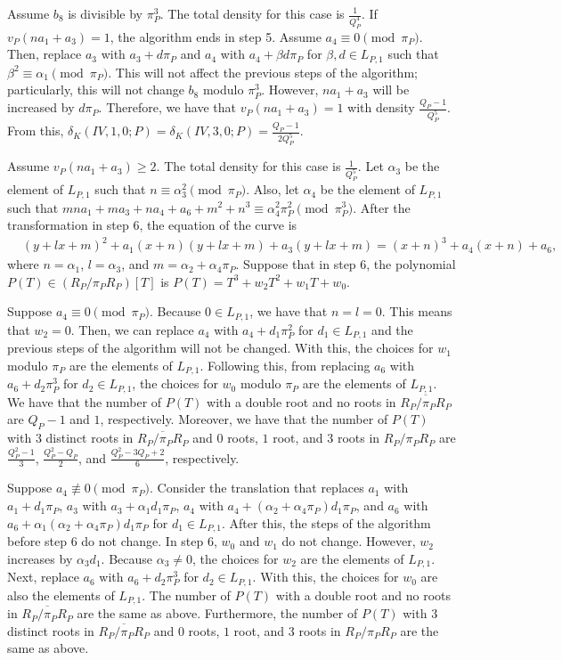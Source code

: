 \documentclass[12pt,letterpaper]{amsart}
\theoremstyle{definition}
\begin{document}
Assume $b_8$ is divisible by $\pi_P^3$. The total density for this case is $\frac{1}{Q_P^4}$. If $v_P(n a_1+a_3)=1$, the algorithm ends in step 5. Assume $a_4\equiv 0\pmod{\pi_P}$. Then, replace $a_3$ with $a_3+d\pi_P$ and $a_4$ with $a_4+\beta d\pi_P$ for $\beta, d\in L_{P,1}$ such that $\beta^2\equiv\alpha_1\pmod{\pi_P}$. This will not affect the previous steps of the algorithm; particularly, this will not change $b_8$ modulo $\pi_P^3$. However, $na_1+a_3$ will be increased by $d\pi_P$. Therefore, we have that $v_P(n a_1+a_3)=1$ with density $\frac{Q_P-1}{Q_P^5}$. From this, $\delta_K(IV,1,0;P)=\delta_K(IV,3,0;P)=\frac{Q_P-1}{2Q_P^5}$.

Assume $v_P(n a_1+a_3)\geq 2$. The total density for this case is $\frac{1}{Q_P^5}$. Let $\alpha_3$ be the element of $L_{P, 1}$ such that $n\equiv\alpha_3^2\pmod{\pi_P}$. Also, let $\alpha_4$ be the element of $L_{P, 1}$ such that
$mna_1+ma_3+na_4+a_6+m^2+n^3\equiv \alpha_4^2\pi_P^2\pmod{\pi_P^3}$. After the transformation in step 6, the equation of the curve is
\begin{align*}
& (y+l x+m)^2+a_1(x+n)(y+l x+m)+a_3(y+l x+m)  =(x+n)^3+a_4(x+n)+a_6,
\end{align*}
where $n=\alpha_1$, $l=\alpha_3$, and $m=\alpha_2+\alpha_4\pi_P$. Suppose that in step 6, the polynomial $P(T)\in (R_P/\pi_PR_P)[T]$ is $P(T)=T^3+w_2T^2+w_1T+w_0$.

Suppose $a_4\equiv 0\pmod{\pi_P}$. Because $0\in L_{P, 1}$, we have that $n=l=0$. This means that $w_2=0$. Then, we can replace $a_4$ with $a_4+d_1\pi_P^2$ for $d_1\in L_{P,1}$ and the previous steps of the algorithm will not be changed. With this, the choices for $w_1$ modulo $\pi_P$ are the elements of $L_{P,1}$. Following this, from replacing $a_6$ with $a_6+d_2\pi_P^3$ for $d_2\in L_{P,1}$, the choices for $w_0$ modulo $\pi_P$ are the elements of $L_{P,1}$. We have that the number of $P(T)$ with a double root and no roots in $\overline{R_P/\pi_PR_P}$ are $Q_P-1$ and $1$, respectively. Moreover, we have that the number of $P(T)$ with $3$ distinct roots in $\overline{R_P/\pi_PR_P}$ and $0$ roots, $1$ root, and $3$ roots in $R_P/\pi_PR_P$ are $\frac{Q_P^2-1}{3}$, $\frac{Q_P^2-Q_P}{2}$, and $\frac{Q_P^2-3Q_P+2}{6}$, respectively.

Suppose $a_4\not\equiv 0\pmod{\pi_P}$. Consider the translation that replaces $a_1$ with $a_1+d_1\pi_P$, $a_3$ with $a_3+\alpha_1d_1\pi_P$, $a_4$ with $a_4+(\alpha_2+\alpha_4\pi_P)d_1\pi_P$, and $a_6$ with $a_6+\alpha_1(\alpha_2+\alpha_4\pi_P) d_1\pi_P$ for $d_1\in L_{P,1}$. After this, the steps of the algorithm before step 6 do not change. In step 6, $w_0$ and $w_1$ do not change. However, $w_2$ increases by $\alpha_3d_1$. Because $\alpha_3\not=0$, the choices for $w_2$ are the elements of $L_{P,1}$. Next, replace $a_6$ with $a_6+d_2\pi_P^3$ for $d_2\in L_{P,1}$. With this, the choices for $w_0$ are also the elements of $L_{P,1}$. The number of $P(T)$ with a double root and no roots in $\overline{R_P/\pi_PR_P}$ are the same as above. Furthermore, the number of $P(T)$ with $3$ distinct roots in $\overline{R_P/\pi_PR_P}$ and $0$ roots, $1$ root, and $3$ roots in $R_P/\pi_PR_P$ are the same as above. 
\end{document}
